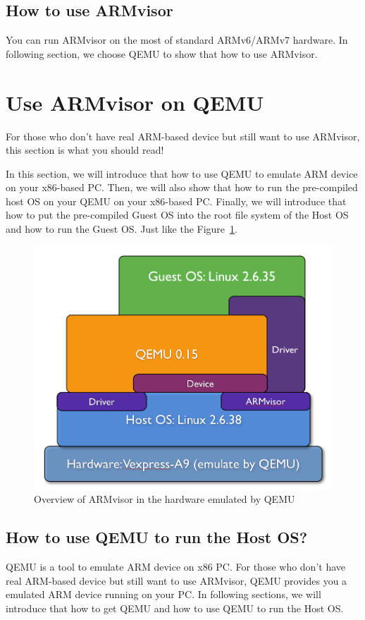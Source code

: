 \documentclass[12pt]{article}  %
\begin{document}
\subsection{How to use ARMvisor}

You can run ARMvisor on the most of standard ARMv6/ARMv7 hardware. In following section, 
we choose QEMU to show that how to use ARMvisor.

\section{Use ARMvisor on QEMU}
For those who don't have real ARM-based device but still want to use ARMvisor, this section is what you should read!

In this section, we will introduce that how to use QEMU to emulate ARM device on your x86-based PC. Then, we will also show that how to run the pre-compiled host OS on your QEMU on your x86-based PC. Finally, we will introduce that how to put the pre-compiled Guest OS into the root file system of the Host OS and how to run the Guest OS. Just like the Figure~\ref{armvisor_archi_qemu}.

\begin{figure}[h]  %
\includegraphics[scale=0.4]{armvisor_archi_qemu.png}
\caption{Overview of ARMvisor in the hardware emulated by QEMU}
\label{armvisor_archi_qemu}
\end{figure}

\subsection{How to use QEMU to run the Host OS?}
QEMU is a tool to emulate ARM device on x86 PC. For those who don't have real ARM-based device but still want to use ARMvisor, QEMU provides you a emulated ARM device running on your PC. In following sections, we will introduce that how to get QEMU and how to use QEMU to run the Host OS.
\end{document}
